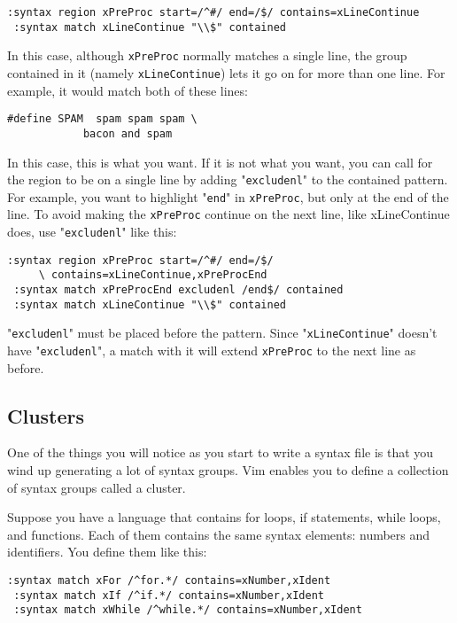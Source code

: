 \begin{Verbatim}[samepage=true]
 :syntax region xPreProc start=/^#/ end=/$/ contains=xLineContinue
 :syntax match xLineContinue "\\$" contained
\end{Verbatim}

In this case, although \texttt{xPreProc} normally matches a single line, the group contained in it (namely \texttt{xLineContinue}) lets it go on for more than one line.
For example, it would match both of these lines:

\begin{Verbatim}[samepage=true]
    #define SPAM  spam spam spam \ 
            bacon and spam 
\end{Verbatim}

In this case, this is what you want.
If it is not what you want, you can call for the region to be on a single line by adding "\texttt{excludenl}" to the contained pattern.
For example, you want to highlight "\texttt{end}" in \texttt{xPreProc}, but only at the end of the line.
To avoid making the \texttt{xPreProc} continue on the next line, like xLineContinue does, use "\texttt{excludenl}" like this:

\begin{Verbatim}[samepage=true]
 :syntax region xPreProc start=/^#/ end=/$/
     \ contains=xLineContinue,xPreProcEnd
 :syntax match xPreProcEnd excludenl /end$/ contained
 :syntax match xLineContinue "\\$" contained
\end{Verbatim}

"\texttt{excludenl}" must be placed before the pattern.
Since "\texttt{xLineContinue}" doesn't have "\texttt{excludenl}", a match with it will extend \texttt{xPreProc} to the next line as before.
\subsection{Clusters}
\label{Clusters}
One of the things you will notice as you start to write a syntax file is that you wind up generating a lot of syntax groups.
Vim enables you to define a collection of syntax groups called a cluster.

Suppose you have a language that contains for loops, if statements, while loops, and functions.
Each of them contains the same syntax elements: numbers and identifiers.
You define them like this:

\begin{Verbatim}[samepage=true]
 :syntax match xFor /^for.*/ contains=xNumber,xIdent
 :syntax match xIf /^if.*/ contains=xNumber,xIdent
 :syntax match xWhile /^while.*/ contains=xNumber,xIdent
\end{Verbatim}

